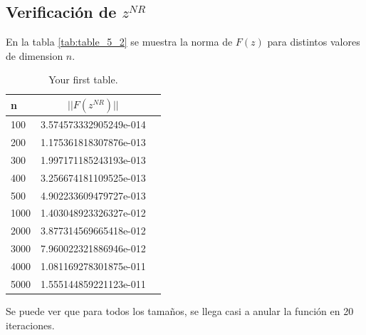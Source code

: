 \documentclass{endm}
\begin{document}
\subsection{Verificación de $z^{NR}$}
En la tabla \ref{tab:table_5_2} se muestra la norma de $F(z)$ para distintos valores de dimension $n$.
\begin{table}[h!]
    \begin{center}
      \caption{Your first table.}
      \label{tab:table1}
      \begin{tabular}{l|c|r} %
        \textbf{n} & \textbf{$||F(z^{NR})||$}\\
        \hline
         100 & 3.574573332905249e-014\\
         200 & 1.175361818307876e-013\\
         300 & 1.997171185243193e-013\\
         400 & 3.256674181109525e-013\\
         500 & 4.902233609479727e-013\\
        1000 & 1.403048923326327e-012\\
        2000 & 3.877314569665418e-012\\
        3000 & 7.960022321886946e-012\\
        4000 & 1.081169278301875e-011\\
        5000 & 1.555144859221123e-011\\
        \hline
      \end{tabular}
    \end{center}
  \end{table}  
Se puede ver que para todos los tamaños, se llega casi a anular la función en 20 iteraciones.

\end{document}
